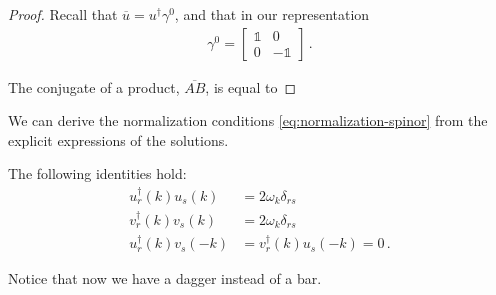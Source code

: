 \documentclass[main.tex]{subfiles}
\begin{document}
\begin{proof}
Recall that \(\overline{u} = u ^\dag \gamma^{0}\), and that in our representation 
%
\begin{align}
\gamma^{0} = \left[\begin{array}{cc}
\mathbb{1} & 0 \\ 
0 & -\mathbb{1}
\end{array}\right]
\,.
\end{align}

The conjugate of a product, \(\overline{AB}\), is equal to 
\end{proof}

\begin{claim}
We can derive the normalization conditions \eqref{eq:normalization-spinor} from the explicit expressions of the solutions.
\end{claim}

\begin{claim}
The following identities hold:
%
\begin{align} 
u_{r}^\dag (k) u_{s}(k) &= 2 \omega_{k}\delta_{rs}  \\
v_{r}^\dag (k) v_{s}(k) &= 2 \omega_{k} \delta_{rs}  \\
u_{r}^\dag (k) v_{s}(-k) &=   
v_{r}^\dag (k) u_{s}(-k) = 0  
\,.
\end{align}

Notice that now we have a dagger instead of a bar.
\end{claim}
\end{document}
